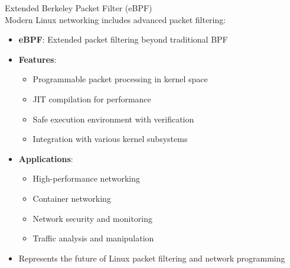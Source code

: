\begin{definition}{Extended Berkeley Packet Filter (eBPF)}\\
    Modern Linux networking includes advanced packet filtering:
    \begin{itemize}
        \item \textbf{eBPF}: Extended packet filtering beyond traditional BPF
        \item \textbf{Features}:
            \begin{itemize}
                \item Programmable packet processing in kernel space
                \item JIT compilation for performance
                \item Safe execution environment with verification
                \item Integration with various kernel subsystems
            \end{itemize}
        \item \textbf{Applications}:
            \begin{itemize}
                \item High-performance networking
                \item Container networking
                \item Network security and monitoring
                \item Traffic analysis and manipulation
            \end{itemize}
        \item Represents the future of Linux packet filtering and network programming
    \end{itemize}
\end{definition}


